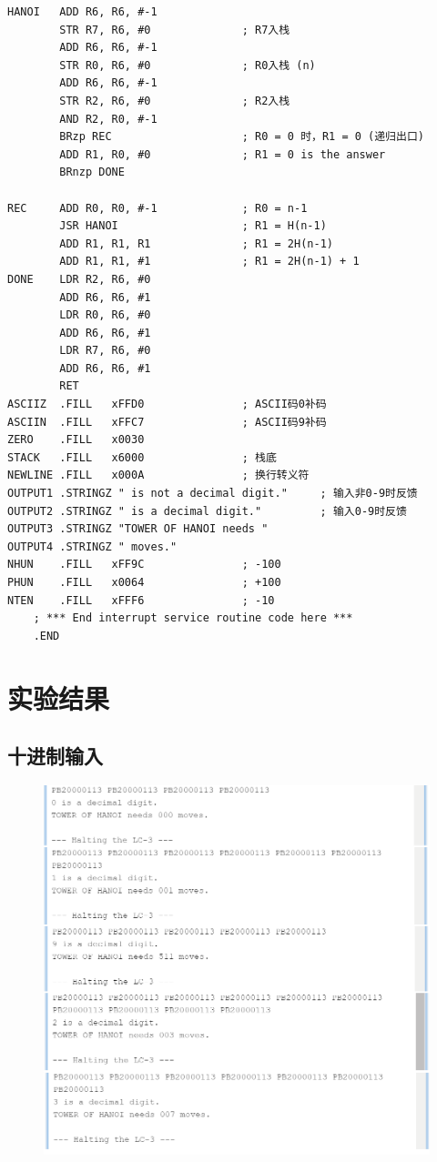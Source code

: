 \documentclass[UTF8]{ctexart}
\begin{document}
\begin{lstlisting}[basicstyle=\ttfamily,language={[x86masm]Assembler}]
HANOI   ADD R6, R6, #-1
        STR R7, R6, #0              ; R7入栈
        ADD R6, R6, #-1
        STR R0, R6, #0              ; R0入栈 (n)
        ADD R6, R6, #-1
        STR R2, R6, #0              ; R2入栈
        AND R2, R0, #-1
        BRzp REC                    ; R0 = 0 时，R1 = 0 (递归出口)    
        ADD R1, R0, #0              ; R1 = 0 is the answer
        BRnzp DONE

REC     ADD R0, R0, #-1             ; R0 = n-1
        JSR HANOI                   ; R1 = H(n-1)
        ADD R1, R1, R1              ; R1 = 2H(n-1)
        ADD R1, R1, #1              ; R1 = 2H(n-1) + 1
DONE    LDR R2, R6, #0
        ADD R6, R6, #1
        LDR R0, R6, #0
        ADD R6, R6, #1
        LDR R7, R6, #0
        ADD R6, R6, #1
        RET
ASCIIZ  .FILL   xFFD0               ; ASCII码0补码
ASCIIN  .FILL   xFFC7               ; ASCII码9补码
ZERO    .FILL   x0030               
STACK   .FILL   x6000               ; 栈底
NEWLINE .FILL   x000A               ; 换行转义符
OUTPUT1 .STRINGZ " is not a decimal digit."     ; 输入非0-9时反馈
OUTPUT2 .STRINGZ " is a decimal digit."         ; 输入0-9时反馈
OUTPUT3 .STRINGZ "TOWER OF HANOI needs "
OUTPUT4 .STRINGZ " moves."
NHUN    .FILL   xFF9C               ; -100
PHUN    .FILL   x0064               ; +100
NTEN    .FILL   xFFF6               ; -10
    ; *** End interrupt service routine code here ***
    .END
\end{lstlisting}

\clearpage
\section{实验结果}
\subsection{十进制输入}
    \begin{figure}[htbp]
        \centering
        \includegraphics[scale=0.6]{de.png}
    \end{figure}
\end{document}
